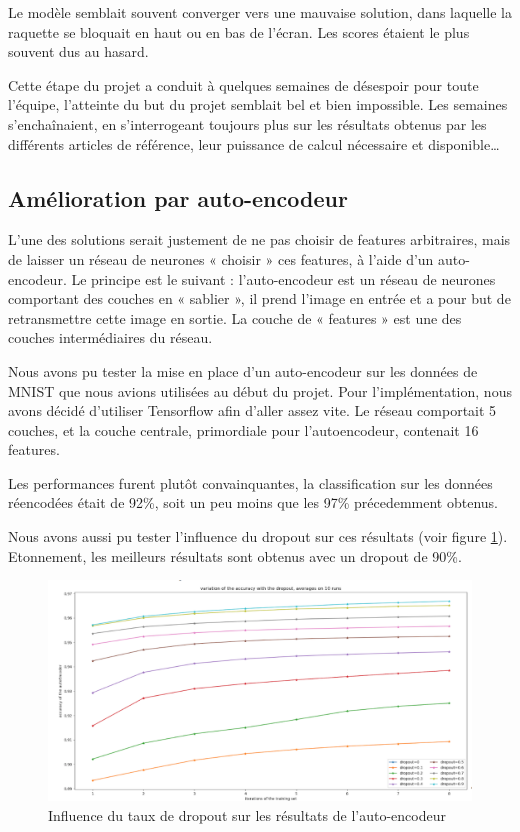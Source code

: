 \documentclass[
    10pt,
    a4paper,
    oneside,
    headinclude,footinclude,
    BCOR=5mm,
    captions=tableabove
]{scrartcl}
\begin{document}
Le modèle semblait souvent converger vers une mauvaise solution, dans laquelle la raquette se bloquait en haut ou en bas de l'écran. Les scores étaient le plus souvent dus au hasard.


Cette étape du projet a conduit à quelques semaines de désespoir pour toute l’équipe, l’atteinte du but du projet semblait bel et bien impossible. Les semaines s’enchaînaient, en s’interrogeant toujours plus sur les résultats obtenus par les différents articles de référence, leur puissance de calcul nécessaire et disponible…

\subsection{Amélioration par auto-encodeur}
L’une des solutions serait justement de ne pas choisir de features arbitraires, mais de laisser un réseau de neurones « choisir » ces features, à l’aide d’un auto-encodeur. Le principe est le suivant : l’auto-encodeur est un réseau de neurones comportant des couches en « sablier », il prend l’image en entrée et a pour but de retransmettre cette image en sortie. La couche de « features » est une des couches intermédiaires du réseau. %

Nous avons pu tester la mise en place d'un auto-encodeur sur les données de MNIST que nous avions utilisées au début du projet. Pour l'implémentation, nous avons décidé d'utiliser Tensorflow afin d'aller assez vite.
Le réseau comportait 5 couches, et la couche centrale, primordiale pour l'autoencodeur, contenait 16 features.

Les performances furent plutôt convainquantes, la classification sur les données réencodées était de 92\%, soit un peu moins que les 97\% précedemment obtenus.

Nous avons aussi pu tester l'influence du dropout sur ces résultats (voir figure \ref{fig:dropout-autoencodeur}). Etonnement, les meilleurs résultats sont obtenus avec un dropout de 90\%.

\begin{figure}
\includegraphics[width=\linewidth]{influence-dropout.png}
\centering
\caption{Influence du taux de dropout sur les résultats de l'auto-encodeur}
\label{fig:dropout-autoencodeur}
\end{figure}
\end{document}
